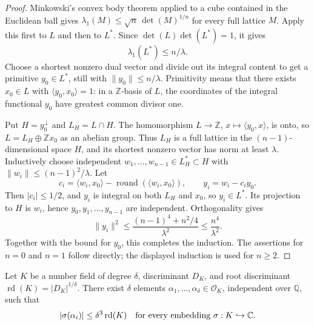 \begin{proof}
Minkowski's convex body theorem applied to a cube contained in the
Euclidean ball gives
\(\lambda_1(M)\le\sqrt n\,\det(M)^{1/n}\) for every full lattice \(M\).
Apply this first to \(L\) and then to \(L^*\).  Since
\(\det(L)\det(L^*)=1\), it gives
\[
 \lambda_1(L^*)\le n/\lambda.
\]
Choose a shortest nonzero dual vector and divide out its integral
content to get a primitive \(y_0\in L^*\), still with
\(\|y_0\|\le n/\lambda\).
Primitivity means that there exists \(x_0\in L\) with
\(\langle y_0,x_0\rangle=1\): in a \(\mathbb Z\)-basis of \(L\), the
coordinates of the integral functional \(y_0\) have greatest common
divisor one.

Put \(H=y_0^\perp\) and \(L_H=L\cap H\).
The homomorphism \(L\to\mathbb Z\), \(x\mapsto\langle y_0,x\rangle\),
is onto, so \(L=L_H\oplus\mathbb Zx_0\) as an abelian group.
Thus \(L_H\) is a full lattice in the \((n-1)\)-dimensional space \(H\),
and its shortest nonzero vector has norm at least \(\lambda\).
Inductively choose independent
\(w_1,\ldots,w_{n-1}\in L_H^*\subset H\) with
\(\|w_i\|\le(n-1)^2/\lambda\).
Let
\[
 c_i=\langle w_i,x_0\rangle-
       \operatorname{round}(\langle w_i,x_0\rangle),\qquad
 y_i=w_i-c_i y_0.
\]
Then \(|c_i|\le1/2\), and \(y_i\) is integral on both \(L_H\) and
\(x_0\), so \(y_i\in L^*\).
Its projection to \(H\) is \(w_i\), hence
\(y_0,y_1,\ldots,y_{n-1}\) are independent.  Orthogonality gives
\[
 \|y_i\|^2
 \le\frac{(n-1)^4+n^2/4}{\lambda^2}
 \le\frac{n^4}{\lambda^2}.
\]
Together with the bound for \(y_0\), this completes the induction.
The assertions for \(n=0\) and \(n=1\) follow directly; the displayed
induction is used for \(n\ge2\).
\end{proof}

\begin{srlemma}
\label{lem:sr-small-integers}
Let \(K\) be a number field of degree \(\delta\), discriminant \(D_K\),
and root discriminant \(\operatorname{rd}(K)=|D_K|^{1/\delta}\).
There exist \(\delta\) elements
\(\alpha_1,\ldots,\alpha_\delta\in\mathcal O_K\), independent over
\(\mathbb Q\), such that
\[
 |\sigma(\alpha_i)|\le
 \delta^3\operatorname{rd}(K)
 \quad\hbox{for every embedding }\sigma:K\hookrightarrow\mathbb C.
\]
\end{srlemma}

